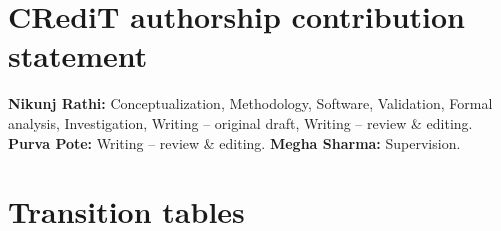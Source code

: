 \documentclass[preprint,12pt]{elsarticle}
\begin{document}
\section*{CRediT authorship contribution statement}
\textbf{Nikunj Rathi:} Conceptualization, Methodology, Software, Validation, Formal analysis, Investigation, Writing -- original draft, Writing -- review \& editing.
\textbf{Purva Pote:} Writing -- review \& editing.
\textbf{Megha Sharma:} Supervision.

\appendix
\section{Transition tables}\label{app:transitions}




\end{document}
